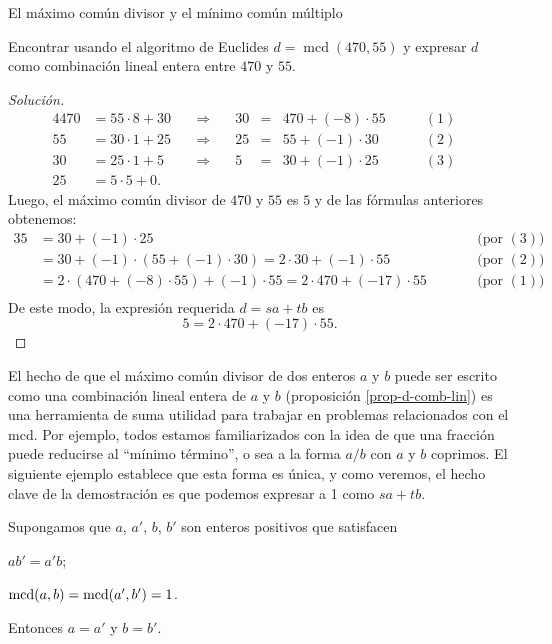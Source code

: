 \begin{section}{El máximo común divisor y el mínimo común múltiplo}
\begin{ejemplo*}
     Encontrar usando el algoritmo de Euclides $d = \operatorname{mcd}( 470, 55)$ y expresar $d$  como combinación lineal entera entre  $470$ y $55$.
\end{ejemplo*}
\begin{proof}[Solución]
    \begin{alignat*}4
    470&=55 \cdot 8 +30&\quad\Rightarrow\quad &30 &=&470 + (-8)\cdot 55&\qquad (1)&\\
    55&=30 \cdot 1 + 25&\quad\Rightarrow\quad &25 &=&55 +(-1)\cdot 30&\qquad (2)&\\
    30&=25 \cdot 1+5&\quad\Rightarrow\quad &5 &=&30 +(-1) \cdot 25&\qquad (3)& \\
    25&=5\cdot 5+0.&&&&&&
    \end{alignat*}
    Luego,  el máximo común divisor de $470$ y $55$ es $5$ y de las fórmulas anteriores obtenemos:
    \begin{alignat*}3
    5 &= 30 +(-1) \cdot 25& &\qquad \text{(por $(3)$)} && \\
    &= 30 + (-1) \cdot (55 +(-1)\cdot 30) = 2 \cdot 30 + (-1) \cdot 55& &\qquad \text{(por $(2)$)}&& \\   
    &=  2 \cdot (470 + (-8)\cdot 55) + (-1) \cdot 55 = 2 \cdot 470 +(-17)\cdot 55& &\qquad \text{(por $(1)$)}&&\\    
    \end{alignat*}
    De este modo, la expresión requerida $d=sa+tb$ es
    $$
    5=2 \cdot 470 +(-17)\cdot 55.
    $$
\end{proof}

El hecho  de que el máximo común divisor de dos enteros $a$ y $b$ puede ser escrito como una combinación lineal entera de $a$ y $b$  (proposición \ref{prop-d-comb-lin}) es una herramienta de suma utilidad para trabajar en problemas relacionados con el mcd. Por ejemplo, todos estamos familiarizados con la idea de que una fracción puede reducirse al ``mínimo término'', o sea a la forma $a/b$ con $a$ y $b$ coprimos. El  siguiente ejemplo establece que esta forma es única, y como veremos, el hecho clave de la demostración es que podemos expresar
a 1 como $sa+tb$.

\begin{ejemplo*} Supongamos que $a$, $a'$, $b$, $b'$ son enteros
positivos que satisfacen
\begin{enumerate}[label=\textit{\alph*)}]
    \begin{minipage}{0.40\textwidth}
    \item\label{a/b=a'/b'} $ab'=a'b$;
    \end{minipage}
    \begin{minipage}{0.40\textwidth}
    \item\label{mcd(a,b)=1} $\operatorname{mcd}(a,b)=\operatorname{mcd}(a',b')=1$.
    \end{minipage}
\end{enumerate}    
Entonces $a=a'$ y $b=b'$.


\end{ejemplo*}
\end{section}
